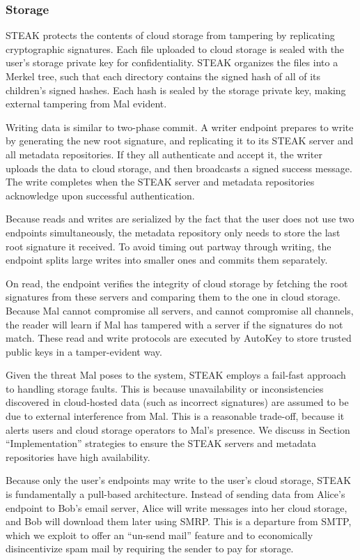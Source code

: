 \subsubsection{Storage}
STEAK protects the contents of cloud storage from tampering by replicating cryptographic signatures.  Each file uploaded to cloud storage is sealed with the user’s storage private key for confidentiality.  STEAK organizes the files into a Merkel tree, such that each directory contains the signed hash of all of its children’s signed hashes.  Each hash is sealed by the storage private key, making external tampering from Mal evident.

Writing data is similar to two-phase commit.  A writer endpoint prepares to write by generating the new root signature, and replicating it to its STEAK server and all metadata repositories.  If they all authenticate and accept it, the writer uploads the data to cloud storage, and then broadcasts a signed success message.  The write completes when the STEAK server and metadata repositories acknowledge upon successful authentication.

Because reads and writes are serialized by the fact that the user does not use two endpoints simultaneously, the metadata repository only needs to store the last root signature it received.  To avoid timing out partway through writing, the endpoint splits large writes into smaller ones and commits them separately.

On read, the endpoint verifies the integrity of cloud storage by fetching the root signatures from these servers and comparing them to the one in cloud storage.  Because Mal cannot compromise all servers, and cannot compromise all channels, the reader will learn if Mal has tampered with a server if the signatures do not match.  These read and write protocols are executed by AutoKey to store trusted public keys in a tamper-evident way.

Given the threat Mal poses to the system, STEAK employs a fail-fast approach to handling storage faults.  This is because unavailability or inconsistencies discovered in cloud-hosted data (such as incorrect signatures) are assumed to be due to external interference from Mal.  This is a reasonable trade-off, because it alerts users and cloud storage operators to Mal’s presence.  We discuss in Section “Implementation” strategies to ensure the STEAK servers and metadata repositories have high availability.

Because only the user’s endpoints may write to the user’s cloud storage, STEAK is fundamentally a pull-based architecture.  Instead of sending data from Alice’s endpoint to Bob’s email server, Alice will write messages into her cloud storage, and Bob will download them later using SMRP.  This is a departure from SMTP, which we exploit to offer an “un-send mail” feature and to economically disincentivize spam mail by requiring the sender to pay for storage.

